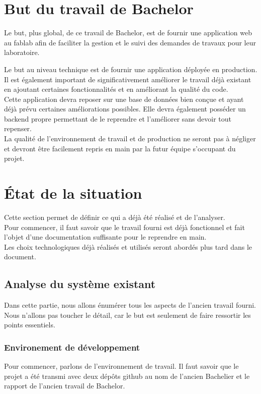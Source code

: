 \documentclass[
    iai, %
    il, %
]{heig-tb}
\begin{document}
\section{But du travail de Bachelor}
Le but, plus global, de ce travail de Bachelor, est de fournir une application web au \Gls{fablab} afin de faciliter la gestion et le suivi des demandes de travaux pour leur laboratoire.

Le but au niveau technique est de fournir une application déployée en production.\\
Il est également important de significativement améliorer le travail déjà existant en ajoutant certaines fonctionnalités et en améliorant la qualité du code.\\
Cette application devra reposer sur une base de données bien conçue et ayant déjà prévu certaines améliorations possibles. Elle devra également posséder un \Gls{backend} propre permettant de le reprendre et l'améliorer sans devoir tout repenser.\\
La qualité de l'environnement de travail et de production ne seront pas à négliger et devront être facilement repris en main par la futur équipe s'occupant du projet.

\section{État de la situation}
Cette section permet de définir ce qui a déjà été réalisé et de l'analyser.\\
Pour commencer, il faut savoir que le travail fourni est déjà fonctionnel et fait l'objet d'une documentation suffisante pour le reprendre en main.\\
Les choix technologiques déjà réalisés et utilisés seront abordés plus tard dans le document.

\subsection{Analyse du système existant}
Dans cette partie, nous allons énumérer tous les aspects de l'ancien travail fourni. Nous n'allons
pas toucher le détail, car le but est seulement de faire ressortir les points essentiels.

\subsubsection{Environement de développement}
Pour commencer, parlons de l'environnement de travail. Il faut savoir que le projet a été transmi avec deux dépôts \Gls{github} au nom de l'ancien Bachelier et le rapport de l'ancien travail de Bachelor.
\end{document}
